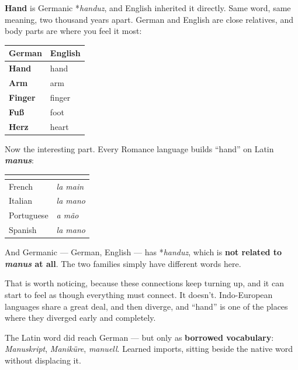 \begin{cousinweb}
\textbf{Hand} is Germanic *\emph{handuz}, and English inherited it directly. Same word, same meaning, two thousand years apart. German and English are close relatives, and body parts are where you feel it most:

\noindent
\begin{tabularx}{\linewidth}{@{}>{\raggedright\arraybackslash}X>{\raggedright\arraybackslash}X@{}}
\toprule
\textbf{German} & \textbf{English} \\
\midrule
\textbf{Hand} & hand \\
\textbf{Arm} & arm \\
\textbf{Finger} & finger \\
\textbf{Fuß} & foot \\
\textbf{Herz} & heart \\
\bottomrule
\end{tabularx}
\end{cousinweb}

\begin{culture}
Now the interesting part. Every Romance language builds \textquotedblleft{}hand\textquotedblright{} on Latin \emph{\textbf{manus}}:

\noindent
\begin{tabularx}{\linewidth}{@{}>{\raggedright\arraybackslash}X>{\raggedright\arraybackslash}X@{}}
\toprule
\textbf{} & \textbf{} \\
\midrule
French & \emph{la main} \\
Italian & \emph{la mano} \\
Portuguese & \emph{a mão} \\
Spanish & \emph{la mano} \\
\bottomrule
\end{tabularx}

And Germanic — German, English — has *\emph{handuz}, which is \textbf{not related to \emph{manus} at all}. The two families simply have different words here.

That is worth noticing, because these connections keep turning up, and it can start to feel as though everything must connect. It doesn't. Indo-European languages share a great deal, and then diverge, and \textquotedblleft{}hand\textquotedblright{} is one of the places where they diverged early and completely.

The Latin word did reach German — but only as \textbf{borrowed vocabulary}: \emph{Manuskript}, \emph{Maniküre}, \emph{manuell}. Learned imports, sitting beside the native word without displacing it.
\end{culture}


